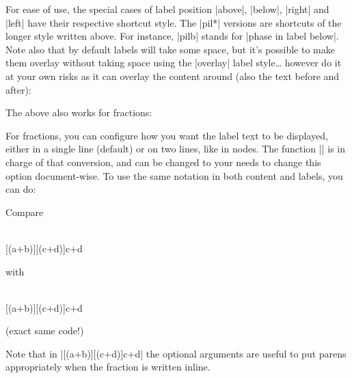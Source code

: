 \documentclass[a4paper]{ltxdoc}
\begin{document}
\begin{pgfmanualentry}
For ease of use, the special cases of label position |above|, |below|, |right| and |left| have their respective shortcut style. The |pil*| versions are shortcuts of the longer style written above. For instance, |pilb| stands for |phase in label below|. Note also that by default labels will take some space, but it's possible to make them overlay without taking space using the |overlay| label style\dots{} however do it at your own risks as it can overlay the content around (also the text before and after):
\begin{codeexample}[width=0pt]
  \zx{
    \zxZ[pilb]{\alpha+\beta} \rar & \zxX[pilb]{\gamma} \rar & \zxZ[pilb=overlay]{\gamma+\eta}
  }
\end{codeexample}
The above also works for fractions:
\begin{codeexample}[]
\end{codeexample}
For fractions, you can configure how you want the label text to be displayed, either in a single line (default) or on two lines, like in nodes. The function |\zxConvertToFracInLabel| is in charge of that conversion, and can be changed to your needs to change this option document-wise. To use the same notation in both content and labels, you can do:
\begin{codeexample}[width=0pt]
  Compare
  \begin{ZX}
     \dar \\
    [(a+b)][(c+d)]{c+d}
  \end{ZX} with
{
  \begin{ZX}
     \dar \\
    [(a+b)][(c+d)]{c+d}
  \end{ZX} (exact same code!)
}
\end{codeexample}
Note that in |[(a+b)][(c+d)]{c+d}| the optional arguments are useful to put parens appropriately when the fraction is written inline.
\end{pgfmanualentry}
\end{document}
